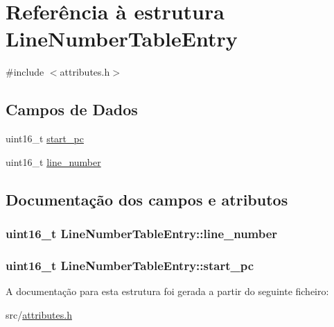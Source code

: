 \hypertarget{structLineNumberTableEntry}{}\section{Referência à estrutura Line\+Number\+Table\+Entry}
\label{structLineNumberTableEntry}


{\ttfamily \#include $<$attributes.\+h$>$}

\subsection*{Campos de Dados}
\begin{DoxyCompactItemize}
\item 
uint16\+\_\+t \hyperlink{structLineNumberTableEntry_a85d30a6f76c8e89a3358b15e2c6597d4}{start\+\_\+pc}
\item 
uint16\+\_\+t \hyperlink{structLineNumberTableEntry_a1fc3df29fa0ec197a90eb50002a20f9a}{line\+\_\+number}
\end{DoxyCompactItemize}


\subsection{Documentação dos campos e atributos}
\subsubsection[{\texorpdfstring{line\+\_\+number}{line_number}}]{\setlength{\rightskip}{0pt plus 5cm}uint16\+\_\+t Line\+Number\+Table\+Entry\+::line\+\_\+number}\hypertarget{structLineNumberTableEntry_a1fc3df29fa0ec197a90eb50002a20f9a}{}\label{structLineNumberTableEntry_a1fc3df29fa0ec197a90eb50002a20f9a}
\subsubsection[{\texorpdfstring{start\+\_\+pc}{start_pc}}]{\setlength{\rightskip}{0pt plus 5cm}uint16\+\_\+t Line\+Number\+Table\+Entry\+::start\+\_\+pc}\hypertarget{structLineNumberTableEntry_a85d30a6f76c8e89a3358b15e2c6597d4}{}\label{structLineNumberTableEntry_a85d30a6f76c8e89a3358b15e2c6597d4}


A documentação para esta estrutura foi gerada a partir do seguinte ficheiro\+:\begin{DoxyCompactItemize}
\item 
src/\hyperlink{attributes_8h}{attributes.\+h}\end{DoxyCompactItemize}
